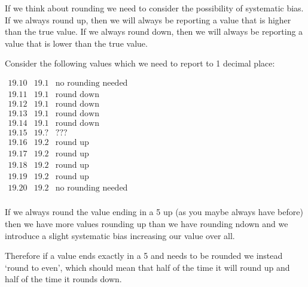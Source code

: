 \documentclass[
  letterpaper,
  DIV=11,
  numbers=noendperiod]{scrreprt}
\begin{document}
If we think about rounding we need to consider the possibility of
systematic bias. If we always round up, then we will always be reporting
a value that is higher than the true value. If we always round down,
then we will always be reporting a value that is lower than the true
value.

Consider the following values which we need to report to 1 decimal
place:

\begin{tcolorbox}[enhanced jigsaw, arc=.35mm, bottomrule=.15mm, bottomtitle=1mm, breakable, colback=white, colbacktitle=quarto-callout-caution-color!10!white, colframe=quarto-callout-caution-color-frame, coltitle=black, left=2mm, leftrule=.75mm, opacityback=0, opacitybacktitle=0.6, rightrule=.15mm, title=\textcolor{quarto-callout-caution-color}{\faFire}\hspace{0.5em}{Rounding values?}, titlerule=0mm, toprule=.15mm, toptitle=1mm]

\(\begin{array}{ccc}
19.10 & 19.1 & \textrm{no rounding needed}\\
19.11 & 19.1 & \textrm{round down}\\
19.12 & 19.1 & \textrm{round down}\\
19.13 & 19.1 & \textrm{round down}\\
19.14 & 19.1 & \textrm{round down}\\
19.15 & 19.? & ???\\
19.16 & 19.2 & \textrm{round up}\\
19.17 & 19.2 & \textrm{round up}\\
19.18 & 19.2 & \textrm{round up}\\
19.19 & 19.2 & \textrm{round up}\\
19.20 & 19.2 & \textrm{no rounding needed}  \\
\end{array}\)

\end{tcolorbox}

If we always round the value ending in a 5 up (as you maybe always have
before) then we have more values rounding up than we have rounding ndown
and we introduce a slight systematic bias increasing our value over all.

Therefore if a value ends exactly in a 5 and needs to be rounded we
instead `round to even', which should mean that half of the time it will
round up and half of the time it rounds down.
\end{document}
